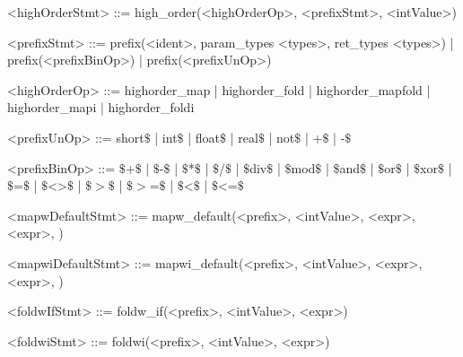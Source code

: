 \documentclass{article}
\begin{document}
\begin{grammar}
<highOrderStmt> ::= high_order(<highOrderOp>, <prefixStmt>, <intValue>)

<prefixStmt> ::= prefix(<ident>, param_types <types>, ret_types <types>) |
                 prefix(<prefixBinOp>) | prefix(<prefixUnOp>)


<highOrderOp> ::= highorder_map | highorder_fold | highorder_mapfold |
                  highorder_mapi | highorder_foldi

<prefixUnOp> ::= short\(\$\) | int\(\$\) | float\(\$\) | real\(\$\) | not\(\$\) | +\(\$\) | -\(\$\)

<prefixBinOp> ::= \(\$\)+\(\$\) | \(\$\)-\(\$\) | \(\$\)*\(\$\) | \(\$\)/\(\$\) |
                  \(\$\)div\(\$\) | \(\$\)mod\(\$\) | \(\$\)and\(\$\) | \(\$\)or\(\$\) | \(\$\)xor\(\$\) |
                  \(\$\)=\(\$\) | \(\$\)<>\(\$\) | \(\$\)\(>\)\(\$\) | \(\$\)\(>\)=\(\$\) | \(\$\)\textless\(\$\) | \(\$\)\textless=\(\$\)

<mapwDefaultStmt> ::= mapw_default(<prefix>, <intValue>, <expr>, <expr>, )

<mapwiDefaultStmt> ::= mapwi_default(<prefix>, <intValue>, <expr>, <expr>, )

<foldwIfStmt> ::= foldw_if(<prefix>, <intValue>, <expr>)

<foldwiStmt> ::= foldwi(<prefix>, <intValue>, <expr>)

\end{grammar}
\end{document}
